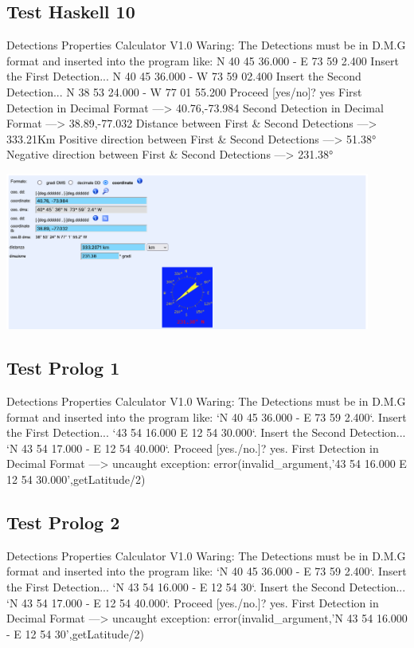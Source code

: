 \documentclass{article}
\begin{document}
\subsection*{Test Haskell 10}
	\begin{spverbatim}
		Detections Properties Calculator V1.0 
		Waring: The Detections must be in D.M.G format and inserted into the program like: N 40 45 36.000 - E 73 59 2.400
		Insert the First Detection...
		N 40 45 36.000 - W 73 59 02.400
		Insert the Second Detection...
		N 38 53 24.000 - W 77 01 55.200
		Proceed [yes/no]?
		yes
		First Detection in Decimal Format ---> 40.76,-73.984
		Second Detection in Decimal Format ---> 38.89,-77.032
		Distance between First & Second Detections ---> 333.21Km
		Positive direction between First & Second Detections ---> 51.38°
		Negative direction between First & Second Detections ---> 231.38°
	\end{spverbatim}
	\includegraphics[width=0.9\textwidth]{Haskell_Tests/10-Calculation_of_Distant_Coordinates_Check}
	
\newpage
\subsection*{Test Prolog 1}
	\begin{spverbatim}
		Detections Properties Calculator V1.0
		Waring: The Detections must be in D.M.G format and inserted into the program like: `N 40 45 36.000 - E 73 59 2.400`.
		Insert the First Detection...
		`43 54 16.000  E 12 54 30.000`.
		Insert the Second Detection...
		`N 43 54 17.000 - E 12 54 40.000`.
		Proceed [yes./no.]?
		yes.
		First Detection in Decimal Format ---> 
		uncaught exception: error(invalid_argument,'43 54 16.000  E 12 54 30.000',getLatitude/2)
	\end{spverbatim}

\subsection*{Test Prolog 2}
	\begin{spverbatim}
		Detections Properties Calculator V1.0
		Waring: The Detections must be in D.M.G format and inserted into the program like: `N 40 45 36.000 - E 73 59 2.400`.
		Insert the First Detection...
		`N 43 54 16.000 - E 12 54 30`.
		Insert the Second Detection...
		`N 43 54 17.000 - E 12 54 40.000`.
		Proceed [yes./no.]?
		yes.
		First Detection in Decimal Format ---> 
		uncaught exception: error(invalid_argument,'N 43 54 16.000 - E 12 54 30',getLatitude/2)
	\end{spverbatim}
\end{document}
